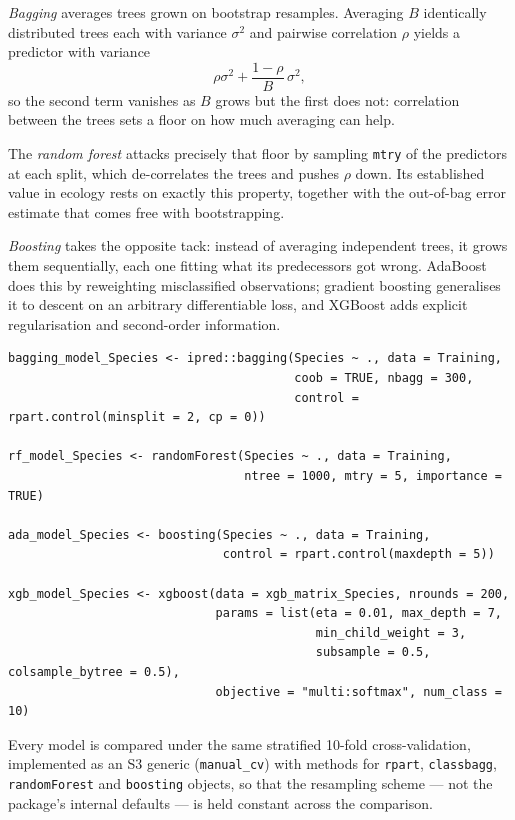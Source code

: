 \documentclass[11pt,oneside]{book}
\newcommand{\code}[1]{\texttt{#1}}
\begin{document}
\emph{Bagging} \cite{Breiman_1996} averages trees grown on bootstrap resamples. Averaging
$B$ identically distributed trees each with variance $\sigma^2$ and pairwise correlation
$\rho$ yields a predictor with variance
\[
  \rho\sigma^{2}+\frac{1-\rho}{B}\,\sigma^{2},
\]
so the second term vanishes as $B$ grows but the first does not: correlation between the
trees sets a floor on how much averaging can help.

The \emph{random forest} \cite{Breiman_2001} attacks precisely that floor by sampling
\code{mtry} of the predictors at each split, which de-correlates the trees and pushes
$\rho$ down. Its established value in ecology \cite{Cutler_2007} rests on exactly this
property, together with the out-of-bag error estimate that comes free with bootstrapping.

\emph{Boosting} takes the opposite tack: instead of averaging independent trees, it grows
them sequentially, each one fitting what its predecessors got wrong. AdaBoost
\cite{Freund_1997} does this by reweighting misclassified observations; gradient boosting
\cite{Friedman_2001} generalises it to descent on an arbitrary differentiable loss, and
XGBoost \cite{Chen_2016} adds explicit regularisation and second-order information.

\begin{lstlisting}
bagging_model_Species <- ipred::bagging(Species ~ ., data = Training,
                                        coob = TRUE, nbagg = 300,
                                        control = rpart.control(minsplit = 2, cp = 0))

rf_model_Species <- randomForest(Species ~ ., data = Training,
                                 ntree = 1000, mtry = 5, importance = TRUE)

ada_model_Species <- boosting(Species ~ ., data = Training,
                              control = rpart.control(maxdepth = 5))

xgb_model_Species <- xgboost(data = xgb_matrix_Species, nrounds = 200,
                             params = list(eta = 0.01, max_depth = 7,
                                           min_child_weight = 3,
                                           subsample = 0.5, colsample_bytree = 0.5),
                             objective = "multi:softmax", num_class = 10)
\end{lstlisting}

Every model is compared under the same stratified 10-fold cross-validation, implemented
as an S3 generic (\code{manual\_cv}) with methods for \code{rpart}, \code{classbagg},
\code{randomForest} and \code{boosting} objects, so that the resampling scheme — not the
package's internal defaults — is held constant across the comparison.
\end{document}
